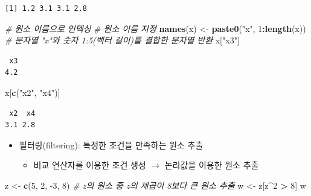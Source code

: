 \documentclass[
  11pt,
]{krantz}
\newenvironment{Shaded}{\begin{snugshade}}{\end{snugshade}}
\newcommand{\CommentTok}[1]{\textcolor[rgb]{0.37,0.37,0.37}{\textit{#1}}}
\newcommand{\DecValTok}[1]{\textcolor[rgb]{0.06,0.06,0.06}{#1}}
\newcommand{\KeywordTok}[1]{\textcolor[rgb]{0.27,0.27,0.27}{\textbf{#1}}}
\newcommand{\NormalTok}[1]{#1}
\newcommand{\OperatorTok}[1]{\textcolor[rgb]{0.43,0.43,0.43}{\textbf{#1}}}
\newcommand{\StringTok}[1]{\textcolor[rgb]{0.5,0.5,0.5}{#1}}
\providecommand{\tightlist}{%
  \setlength{\itemsep}{0pt}\setlength{\parskip}{0pt}}
\begin{document}
\begin{verbatim}
[1] 1.2 3.1 3.1 2.8
\end{verbatim}

\begin{Shaded}
\begin{Highlighting}[]
\CommentTok{# 원소 이름으로 인덱싱}
\CommentTok{# 원소 이름 지정}
\KeywordTok{names}\NormalTok{(x) <-}\StringTok{ }\KeywordTok{paste0}\NormalTok{(}\StringTok{"x"}\NormalTok{, }\DecValTok{1}\OperatorTok{:}\KeywordTok{length}\NormalTok{(x)) }\CommentTok{# 문자열 "x"와 숫자 1:5(벡터 길이)를 결합한 문자열 반환}
\NormalTok{x[}\StringTok{"x3"}\NormalTok{]}
\end{Highlighting}
\end{Shaded}

\begin{verbatim}
 x3 
4.2 
\end{verbatim}

\begin{Shaded}
\begin{Highlighting}[]
\NormalTok{x[}\KeywordTok{c}\NormalTok{(}\StringTok{"x2"}\NormalTok{, }\StringTok{"x4"}\NormalTok{)]}
\end{Highlighting}
\end{Shaded}

\begin{verbatim}
 x2  x4 
3.1 2.8 
\end{verbatim}

\normalsize

\begin{itemize}
\tightlist
\item
  필터링(filtering): 특정한 조건을 만족하는 원소 추출

  \begin{itemize}
  \tightlist
  \item
    비교 연산자를 이용한 조건 생성 \(\rightarrow\) 논리값을 이용한 원소 추출
  \end{itemize}
\end{itemize}

\footnotesize

\begin{Shaded}
\begin{Highlighting}[]
\NormalTok{z <-}\StringTok{ }\KeywordTok{c}\NormalTok{(}\DecValTok{5}\NormalTok{, }\DecValTok{2}\NormalTok{, }\DecValTok{-3}\NormalTok{, }\DecValTok{8}\NormalTok{)}
\CommentTok{# z의 원소 중 z의 제곱이 8보다 큰 원소 추출}
\NormalTok{w <-}\StringTok{ }\NormalTok{z[z}\OperatorTok{^}\DecValTok{2} \OperatorTok{>}\StringTok{ }\DecValTok{8}\NormalTok{]}
\NormalTok{w}
\end{Highlighting}
\end{Shaded}
\end{document}
